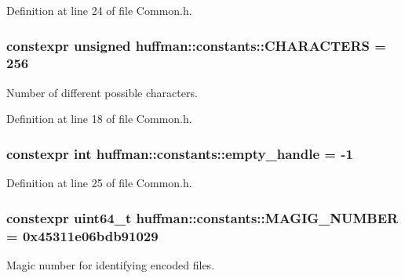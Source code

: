 Definition at line 24 of file Common.\+h.

\subsubsection[{\texorpdfstring{C\+H\+A\+R\+A\+C\+T\+E\+RS}{CHARACTERS}}]{\setlength{\rightskip}{0pt plus 5cm}constexpr unsigned huffman\+::constants\+::\+C\+H\+A\+R\+A\+C\+T\+E\+RS = 256\hspace{0.3cm}{\ttfamily [static]}}\hypertarget{namespacehuffman_1_1constants_a263e0c34ff9ba6afe32efbc1eeabdf88}{}\label{namespacehuffman_1_1constants_a263e0c34ff9ba6afe32efbc1eeabdf88}
Number of different possible characters. 

Definition at line 18 of file Common.\+h.

\subsubsection[{\texorpdfstring{empty\+\_\+handle}{empty_handle}}]{\setlength{\rightskip}{0pt plus 5cm}constexpr int huffman\+::constants\+::empty\+\_\+handle = -\/1\hspace{0.3cm}{\ttfamily [static]}}\hypertarget{namespacehuffman_1_1constants_a807803821447a0285e3dfd195ee698e7}{}\label{namespacehuffman_1_1constants_a807803821447a0285e3dfd195ee698e7}


Definition at line 25 of file Common.\+h.

\subsubsection[{\texorpdfstring{M\+A\+G\+I\+G\+\_\+\+N\+U\+M\+B\+ER}{MAGIG_NUMBER}}]{\setlength{\rightskip}{0pt plus 5cm}constexpr uint64\+\_\+t huffman\+::constants\+::\+M\+A\+G\+I\+G\+\_\+\+N\+U\+M\+B\+ER = 0x45311e06bdb91029\hspace{0.3cm}{\ttfamily [static]}}\hypertarget{namespacehuffman_1_1constants_adc8c2b0fcb5eadd26aa1f9535d95ab6e}{}\label{namespacehuffman_1_1constants_adc8c2b0fcb5eadd26aa1f9535d95ab6e}
Magic number for identifying encoded files. 

